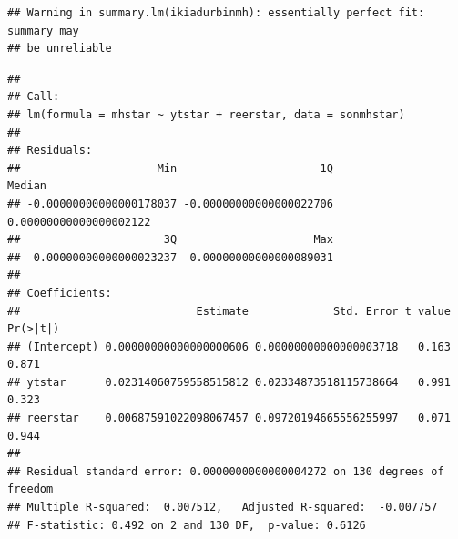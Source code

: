 \documentclass[]{article}
\newenvironment{Shaded}{\begin{snugshade}}{\end{snugshade}}
\newcommand{\KeywordTok}[1]{\textcolor[rgb]{0.13,0.29,0.53}{\textbf{#1}}}
\newcommand{\DataTypeTok}[1]{\textcolor[rgb]{0.13,0.29,0.53}{#1}}
\newcommand{\DecValTok}[1]{\textcolor[rgb]{0.00,0.00,0.81}{#1}}
\newcommand{\StringTok}[1]{\textcolor[rgb]{0.31,0.60,0.02}{#1}}
\newcommand{\OperatorTok}[1]{\textcolor[rgb]{0.81,0.36,0.00}{\textbf{#1}}}
\newcommand{\NormalTok}[1]{#1}
\begin{document}
\begin{Shaded}
\end{Shaded}

\begin{verbatim}
## Warning in summary.lm(ikiadurbinmh): essentially perfect fit: summary may
## be unreliable
\end{verbatim}

\begin{Shaded}
\end{Shaded}

\begin{verbatim}
## 
## Call:
## lm(formula = mhstar ~ ytstar + reerstar, data = sonmhstar)
## 
## Residuals:
##                     Min                      1Q                  Median 
## -0.00000000000000178037 -0.00000000000000022706  0.00000000000000002122 
##                      3Q                     Max 
##  0.00000000000000023237  0.00000000000000089031 
## 
## Coefficients:
##                           Estimate             Std. Error t value Pr(>|t|)
## (Intercept) 0.00000000000000000606 0.00000000000000003718   0.163    0.871
## ytstar      0.02314060759558515812 0.02334873518115738664   0.991    0.323
## reerstar    0.00687591022098067457 0.09720194665556255997   0.071    0.944
## 
## Residual standard error: 0.0000000000000004272 on 130 degrees of freedom
## Multiple R-squared:  0.007512,   Adjusted R-squared:  -0.007757 
## F-statistic: 0.492 on 2 and 130 DF,  p-value: 0.6126
\end{verbatim}
\end{document}
